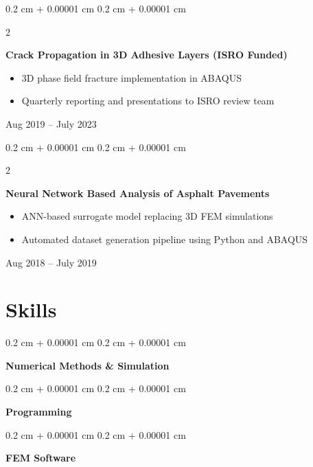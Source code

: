 \documentclass[10pt, letterpaper]{article}
\newenvironment{highlights}{
    \begin{itemize}[
        topsep=0.10 cm,
        parsep=0.10 cm,
        partopsep=0pt,
        itemsep=0pt,
        leftmargin=0.4 cm + 10pt
    ]
}{
    \end{itemize}
} %
\newenvironment{onecolentry}{
    \begin{adjustwidth}{
        0.2 cm + 0.00001 cm
    }{
        0.2 cm + 0.00001 cm
    }
}{
    \end{adjustwidth}
} %
\newenvironment{twocolentry}[2][]{
    \onecolentry
    \def\secondColumn{#2}
    \setcolumnwidth{\fill, 4.5 cm}
    \begin{paracol}{2}
}{
    \switchcolumn \raggedleft \secondColumn
    \end{paracol}
    \endonecolentry
} %
\begin{document}
        \vspace{0.2 cm}

        \begin{twocolentry}{
            Aug 2019 – July 2023
        }
            \textbf{Crack Propagation in 3D Adhesive Layers (ISRO Funded)}
            \begin{highlights}
                \item 3D phase field fracture implementation in ABAQUS
                \item Quarterly reporting and presentations to ISRO review team
            \end{highlights}
        \end{twocolentry}


        \vspace{0.2 cm}

        \begin{twocolentry}{
            Aug 2018 – July 2019
        }
            \textbf{Neural Network Based Analysis of Asphalt Pavements}
            \begin{highlights}
                \item ANN-based surrogate model replacing 3D FEM simulations
                \item Automated dataset generation pipeline using Python and ABAQUS
            \end{highlights}
        \end{twocolentry}



    
    \section{Skills}



        
        \begin{onecolentry}
            \textbf{Numerical Methods \& Simulation}
        \end{onecolentry}


        \vspace{0.2 cm}

        \begin{onecolentry}
            \textbf{Programming}
        \end{onecolentry}


        \vspace{0.2 cm}

        \begin{onecolentry}
            \textbf{FEM Software}
        \end{onecolentry}
\end{document}
